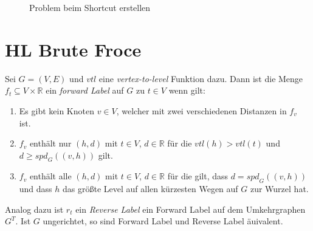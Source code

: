 \begin{figure}[ht]
    \centering

    \caption{Problem beim Shortcut erstellen}
    \label{ch:fig:problem_shortcut}
\end{figure}

\chapter{HL Brute Froce}


\begin{definition}
    Sei $G = (V, E)$ und ${vtl}$ eine \emph{vertex-to-level} Funktion dazu. Dann ist die Menge $f_t \subseteq V \times \mathbb{R}$ ein \emph{forward Label} auf $G$ zu $t \in V$ wenn gilt:

    \begin{enumerate}
        \item
              Es gibt kein Knoten $v \in V$, welcher mit zwei verschiedenen Distanzen in $f_v$ ist.

        \item
              $f_v$ enthält nur $(h, d)$ mit $t \in V$, $d \in \mathbb{R}$ für die ${vtl}(h) > {vtl}(t)$ und $d \geq {spd}_G ((v, h))$ gilt.

        \item
              $f_v$ enthält alle $(h, d)$ mit $t \in V$, $d \in \mathbb{R}$ für die gilt, dass $d = {spd}_G ((v, h))$ und dass $h$ das größte Level auf allen kürzesten Wegen auf $G$ zur Wurzel hat.
    \end{enumerate}

    Analog dazu ist $r_t$ ein \emph{Reverse Label} ein Forward Label auf dem Umkehrgraphen $G^T$. Ist $G$ ungerichtet, so sind Forward Label und Reverse Label äuivalent.
\end{definition}

